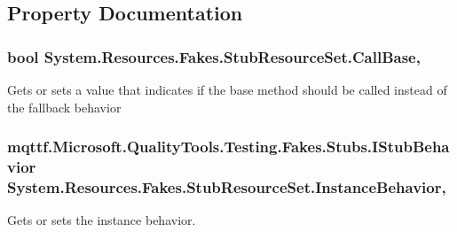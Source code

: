 \subsection{Property Documentation}
\hypertarget{class_system_1_1_resources_1_1_fakes_1_1_stub_resource_set_a5fd979a55ae1aa653878711035ef4c09}{
\subsubsection[{Call\-Base}]{\setlength{\rightskip}{0pt plus 5cm}bool System.\-Resources.\-Fakes.\-Stub\-Resource\-Set.\-Call\-Base\hspace{0.3cm}{\ttfamily [get]}, {\ttfamily [set]}}}\label{class_system_1_1_resources_1_1_fakes_1_1_stub_resource_set_a5fd979a55ae1aa653878711035ef4c09}


Gets or sets a value that indicates if the base method should be called instead of the fallback behavior

\hypertarget{class_system_1_1_resources_1_1_fakes_1_1_stub_resource_set_a2f197e05d8e99ec052001c1a2297ab16}{
\subsubsection[{Instance\-Behavior}]{\setlength{\rightskip}{0pt plus 5cm}mqttf.\-Microsoft.\-Quality\-Tools.\-Testing.\-Fakes.\-Stubs.\-I\-Stub\-Behavior System.\-Resources.\-Fakes.\-Stub\-Resource\-Set.\-Instance\-Behavior\hspace{0.3cm}{\ttfamily [get]}, {\ttfamily [set]}}}\label{class_system_1_1_resources_1_1_fakes_1_1_stub_resource_set_a2f197e05d8e99ec052001c1a2297ab16}


Gets or sets the instance behavior.


